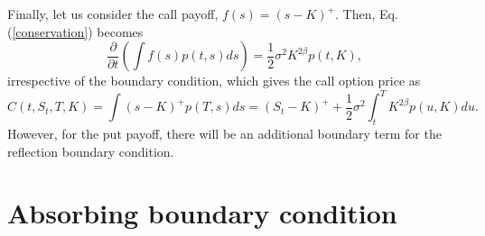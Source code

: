 \documentclass[12pt]{article}
\begin{document}
  Finally, let us consider the call payoff, $f(s)=(s-K)^+$. Then, Eq. (\ref{conservation}) becomes
  \begin{equation}
    \frac{\partial}{\partial t}\left(\int f(s)p(t,s)ds\right) = \frac{1}{2}\sigma^2K^{2\beta}p(t,K),
  \end{equation}
  irrespective of the boundary condition, which gives the call option price as
  \begin{equation}
    C(t,S_t,T,K) = \int (s-K)^+p(T,s)ds = (S_t-K)^++\frac{1}{2}\sigma^2\int_t^T K^{2\beta}p(u,K)du.
  \end{equation}
  However, for the put payoff, there will be an additional boundary term for the reflection boundary condition.



\section{Absorbing boundary condition}
\end{document}
